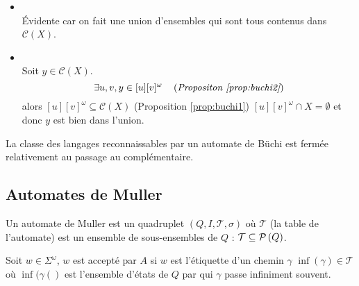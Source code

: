 \begin{proofI}
	\begin{itemize}
		\item \fbox{$\supseteq$} \\
		      Évidente car on fait une union d'ensembles qui sont tous contenus dans $\mathcal C (X)$.
		\item \fbox{$\subseteq$} \\
		      Soit $y \in \mathcal C (X)$.
		      $$\exists u,v, y \in [u][v]^{\omega} \quad\left(\textit{Propositon \ref{prop:buchi2}}\right)$$
		      alors $[u][v]^{\omega} \subseteq \mathcal C (X)$ (Proposition \ref{prop:buchi1})
		      \cad $[u][v]^{\omega} \cap X = \emptyset$ et donc $y$ est bien dans l'union.
	\end{itemize}
\end{proofI}

\begin{coro}
	La classe des langages reconnaissables par un automate de Büchi est fermée relativement au passage au complémentaire.
\end{coro}


\subsection{Automates de Muller}

\begin{definition}
	Un automate de Muller est un quadruplet $(Q,I, \mathcal T, \sigma)$ où $\mathcal T$ (la table de l'automate) est un ensemble de sous-ensembles
	de $Q$ : $\mathcal T \subseteq \mathcal{P}\left(Q\right)$.

	Soit $w \in \Sigma^{\omega}$, $w$ est accepté par $A$ si $w$ est l'étiquette d'un chemin $\gamma$ \tq $\inf ({\gamma}) \in \mathcal T$ où
	$\inf ({\gamma}()$ est l'ensemble d'états de $Q$ par qui $\gamma$ passe infiniment souvent.

\end{definition}
